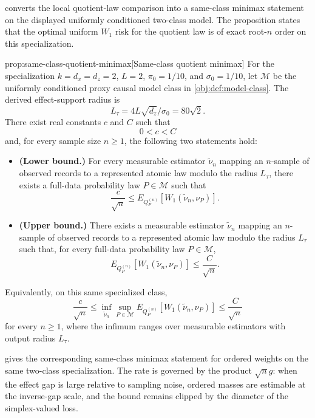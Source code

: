 \documentclass[11pt]{article}
\begin{document}
 converts the local quotient-law comparison into a same-class minimax statement on the displayed uniformly conditioned two-class model. The proposition states that the optimal uniform \(W_1\) risk for the quotient law is of exact root-\(n\) order on this specialization.

\begin{propositionv}{prop:same-class-quotient-minimax}[Same-class quotient minimax]
For the specialization \(k=d_x=d_z=2\), \(L=2\), \(\pi_0=1/10\), and \(\sigma_0=1/10\), let \(\mathcal M\) be the uniformly conditioned proxy causal model class in \cref{obj:def:model-class}.  The derived effect-support radius is
\[
L_\tau=4L\sqrt{d_z}/\sigma_0=80\sqrt 2 .
\]
There exist real constants \(c\) and \(C\) such that
\[
0<c<C
\]
and, for every sample size \(n\ge 1\), the following two statements hold:
\begin{itemize}
\item \textbf{(Lower bound.)} For every measurable estimator \(\widetilde\nu_n\) mapping an \(n\)-sample of observed records to a represented atomic law modulo the radius \(L_\tau\), there exists a full-data probability law \(P\in\mathcal M\) such that
\[
\frac{c}{\sqrt n}
\le
E_{Q_P^{(n)}}\!\left[
  W_1\!\left(\widetilde\nu_n,\nu_P\right)
\right].
\]
\item \textbf{(Upper bound.)} There exists a measurable estimator \(\widetilde\nu_n\) mapping an \(n\)-sample of observed records to a represented atomic law modulo the radius \(L_\tau\) such that, for every full-data probability law \(P\in\mathcal M\),
\[
E_{Q_P^{(n)}}\!\left[
  W_1\!\left(\widetilde\nu_n,\nu_P\right)
\right]
\le
\frac{C}{\sqrt n}.
\]
\end{itemize}
Equivalently, on this same specialized class,
\[
\frac{c}{\sqrt n}
\le
\inf_{\widetilde\nu_n}\sup_{P\in\mathcal M}
E_{Q_P^{(n)}}\!\left[
  W_1\!\left(\widetilde\nu_n,\nu_P\right)
\right]
\le
\frac{C}{\sqrt n}
\]
for every \(n\ge 1\), where the infimum ranges over measurable estimators with output radius \(L_\tau\).
\end{propositionv}

 gives the corresponding same-class minimax statement for ordered weights on the same two-class specialization. The rate is governed by the product \(\sqrt n g\): when the effect gap is large relative to sampling noise, ordered masses are estimable at the inverse-gap scale, and the bound remains clipped by the diameter of the simplex-valued loss.
\end{document}
